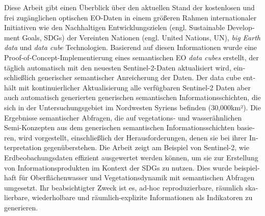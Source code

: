 \begin{otherlanguage}{ngerman}
Diese Arbeit gibt einen Überblick über den aktuellen Stand der kostenlosen und frei zugänglichen optischen \acs{EO}-Daten in einem größeren Rahmen internationaler Initiativen wie den Nachhaltigen Entwicklungszielen (engl. Sustainable Development Goals, \acp{SDG}) der Vereinten Nationen (engl. United Nations, \acs{UN}), \emph{big Earth data} und \emph{data cube} Technologien. Basierend auf diesen Informationen wurde eine Proof-of-Concept-Implementierung eines semantischen \acs{EO} \emph{data cubes} erstellt, der täglich automatisch mit den neuesten Sentinel-2-Daten aktualisiert wird, einschließlich generischer semantischer Anreicherung der Daten. Der data cube enthält mit kontinuierlicher Aktualisierung alle verfügbaren Sentinel-2 Daten aber auch automatisch generierten generischen semantischen Informationsschichten, die sich in der Untersuchungsgebiet im Nordwesten Syriens befinden (30,000\acs{km}²). Die Ergebnisse semantischer Abfragen, die auf vegetations- und wasserähnlichen Semi-Konzepten aus dem generischen semantischen Informationsschichten basieren, wird vorgestellt, einschließlich der Herausforderungen, denen sie bei ihrer Interpretation gegenüberstehen. Die Arbeit zeigt am Beispiel von Sentinel-2, wie Erdbeobachungsdaten effizient ausgewertet werden können, um sie zur Erstellung von Informationsprodukten im Kontext der \acp{SDG} zu nutzen. Dies wurde beispielhaft für Oberflächenwasser und Vegetationsdynamik mit semantischen Abfragen umgesetzt. Ihr beabsichtigter Zweck ist es, ad-hoc reproduzierbare, räumlich skalierbare, wiederholbare und räumlich-explizite Informationen als Indikatoren zu generieren.

\normalsize


\end{otherlanguage}

\endgroup

\vfill
